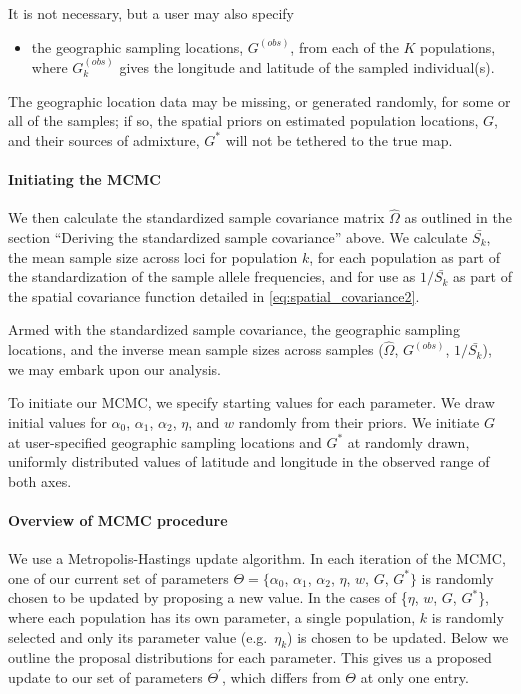 \documentclass[12pt]{article}
\newcommand{\identifyadmixsource}[1]{{#1^{*}}}
\begin{document}
It is not necessary, but a user may also specify 
\begin{itemize}
\item the geographic sampling locations, $G^{(obs)}$, from each of the $K$ populations, where $G^{(obs)}_k$ gives the longitude and latitude of the sampled individual(s).
\end{itemize}

The geographic location data may be missing, or generated randomly, for some or all of the samples; if so, the spatial priors on estimated population locations, $G$, and their sources of admixture, $\identifyadmixsource{G}$ will not be tethered to the true map. 

\paragraph{Initiating the MCMC}
We then calculate the standardized sample covariance matrix $\widehat{\Omega}$ as outlined in the section ``Deriving the standardized sample covariance'' above.  We calculate $\bar{S_k}$, the mean sample size across loci for population $k$, for each population as part of the standardization of the sample allele frequencies, and for use as $1/\bar{S_k}$ as part of the spatial covariance function detailed in \eqref{eq:spatial_covariance2}.

Armed with the standardized sample covariance, the geographic sampling locations, and the inverse mean sample sizes across samples ($\widehat{\Omega}$, $G^{(obs)}$, $1/\bar{S_k}$), we may embark upon our analysis.

To initiate our MCMC, we specify starting values for each parameter.  We draw initial values for $\alpha_0$, $\alpha_1$, $\alpha_2$, $\eta$, and $w$ randomly from their priors.  We initiate $G$ at user-specified geographic sampling locations and $\identifyadmixsource{G}$ at randomly drawn, uniformly distributed values of latitude and longitude in the observed range of both axes.  

\paragraph{Overview of MCMC procedure}
We use a Metropolis-Hastings update algorithm. 
In each iteration of the MCMC, one of our current set of parameters 
$\Theta= \{\alpha_0$, $\alpha_1$, $\alpha_2$, $\eta$, $w$, $G$, $\identifyadmixsource{G}\}$ 
is randomly chosen to be updated by proposing a new value.  
In the cases of \{$\eta$, $w$, $G$, $\identifyadmixsource{G}$\}, where each population has its own parameter, a single population, $k$ 
is randomly selected and only its parameter value (e.g.\ $\eta_k$) is chosen to be updated. 
Below we outline the proposal distributions for each parameter. 
This gives us a proposed update to our set of parameters $\Theta^{\prime}$, which differs from $\Theta$ at only one entry.
\end{document}

